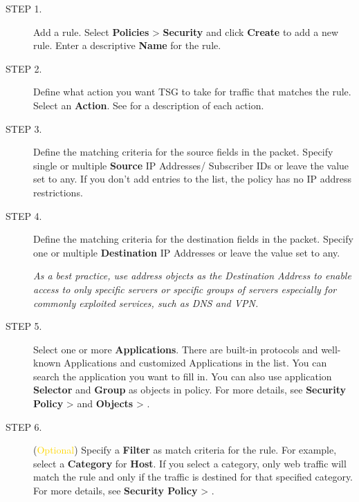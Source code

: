 \begin{description}
    \item[STEP 1.]	Add a rule. Select \textbf{Policies} > \textbf{Security} and click \textbf{Create} to add a new rule. Enter a descriptive \textbf{Name} for the rule.
    \item[STEP 2.]	Define what action you want TSG to take for traffic that matches the rule. Select an \textbf{Action}. 
    See \hyperlink{link:Security Actions}{\color{linkblue}{Security Policy Actions}} for a description of each action.
    \item[STEP 3.]	Define the matching criteria for the source fields in the packet. Specify single or multiple \textbf{Source} IP Addresses/ Subscriber IDs or leave the value set to any. If you don’t add entries to the list, the policy has no IP address restrictions.
    \item[STEP 4.]	Define the matching criteria for the destination fields in the packet. Specify one or multiple \textbf{Destination} IP Addresses or leave the value set to any.
    
    
    \notemark\textit{As a best practice, use address objects as the Destination Address to enable access to only specific servers or specific groups of servers especially 
    for commonly exploited services, such as DNS and VPN.}
    \item[STEP 5.]	Select one or more \textbf{Applications}. There are built-in protocols and well-known Applications and customized Applications in the list. 
    You can search the application you want to fill in. You can also use application \textbf{Selector} and \textbf{Group} as objects in policy. 
    For more details, see \textbf{Security Policy} > \textbf{\hyperlink{link:Security Applications and Filters}{\color{linkblue}{Applications and Filters}}} and \textbf{Objects} > \textbf{\hyperlink{link:Applications}{\color{linkblue}{Applications}}}.
    \item[STEP 6.]	(\textcolor{gold}{Optional}) Specify a \textbf{Filter} as match criteria for the rule. For example, select a \textbf{Category} for \textbf{Host}. 
    If you select a category, only web traffic will match the rule and only if the traffic is destined for that specified category. 
    For more details, see \textbf{Security Policy} > \textbf{\hyperlink{link:Security Applications and Filters}{\color{linkblue}{Applications and Filters}}}.
    

\end{description}
